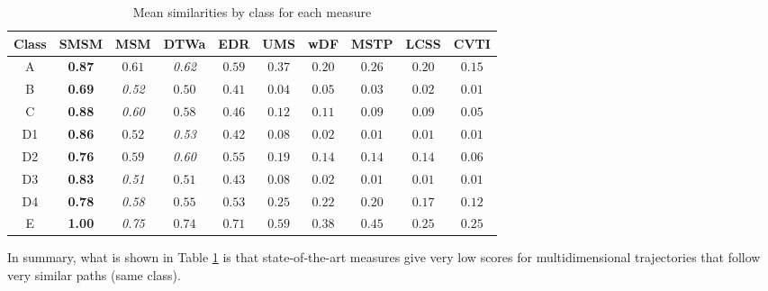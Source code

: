 \documentclass[12pt]{article}
\begin{document}
\begin{table}[ht!]
\footnotesize
  \centering
  \begin{tabular}{|c|c|c|c|c|c|c|c|c|c|}
  	\hline
 Class & SMSM & MSM & DTWa & EDR & UMS & wDF & MSTP & LCSS & CVTI \\
  	\hline
 A & \textbf{0.87} & $0.61$ & \textit{0.62} & $ 0.59$ & $0.37$ & $0.20$& $0.26$ & $0.20$ & $0.15$  \\
 B & \textbf{0.69} & \textit{0.52} & $0.50$ & $ 0.41$ & $0.04$ & $0.05$& $0.03$ & $0.02$ & $0.01$ \\
 C & \textbf{0.88} & \textit{0.60} & $0.58$ & $ 0.46$ & $0.12$ & $0.11$& $0.09$ & $0.09$ & $0.05$ \\
D1 & \textbf{0.86} & $0.52$ & \textit{0.53} & $ 0.42$ & $0.08$ & $0.02$& $0.01$ & $0.01$ & $0.01$ \\
D2 & \textbf{0.76} & $0.59$ & \textit{0.60} & $ 0.55$ & $0.19$ & $0.14$& $0.14$ & $0.14$ & $0.06$ \\
D3 & \textbf{0.83} & \textit{0.51} & $0.51$ & $ 0.43$ & $0.08$ & $0.02$& $0.01$ & $0.01$ & $0.01$ \\
D4 & \textbf{0.78} & \textit{0.58} & $0.55$ & $ 0.53$ & $0.25$ & $0.22$& $0.20$ & $0.17$ & $0.12$ \\
E  & \textbf{1.00} & \textit{0.75} & $0.74$ & $ 0.71$ & $0.59$ & $0.38$& $0.45$ & $0.25$ & $0.25$ \\
    \hline
  \end{tabular}
  \caption{Mean similarities by class for each measure}
  \label{tab:geolife_similaritymeans}
\end{table}

In summary, what is shown in Table \ref{tab:geolife_similaritymeans} is that state-of-the-art measures give very low scores for multidimensional trajectories that follow very similar paths (same class).
\end{document}
